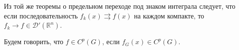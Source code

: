 Из той же теоремы о предельном переходе под знаком интеграла следует, что если
последовательность $ f_k(x) \rightrightarrows f(x)$ на каждом компакте, то $ f_k \to f \in
\mathcal D'(\mathbb R^n) $.

Будем говорить, что $ f \in C^p(G) $, если $ f_G(x) \in C^p(G) $.

